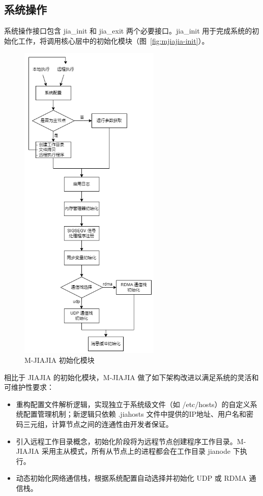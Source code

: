 {    \subsection{系统操作}\label{sec:init}
    系统操作接口包含 jia\_init 和 jia\_exit 两个必要接口。jia\_init 用于完成系统的初始化工作，将调用核心层中的初始化模块（图~\ref{fig:mjiajia-init}）。
    \begin{figure}[!htbp]
        \centering
        \includegraphics[width=0.6\textwidth]{Img/M-JIAJIA-init.png}
        \caption{M-JIAJIA 初始化模块}
    \end{figure}
    相比于 JIAJIA 的初始化模块，M-JIAJIA 做了如下架构改进以满足系统的灵活和可维护性要求：
    \begin{itemize}
        \item 重构配置文件解析逻辑，实现独立于系统级文件（如 /etc/hosts）的自定义系统配置管理机制；新逻辑只依赖 .jiahosts 文件中提供的IP地址、用户名和密码三元组，计算节点之间的连通性由开发者保证。
        \item 引入远程工作目录概念，初始化阶段将为远程节点创建程序工作目录。M-JIAJIA 采用主从模式，所有从节点上的进程都会在工作目录 jianode 下执行。
        \item 动态初始化网络通信栈，根据系统配置自动选择并初始化 UDP 或 RDMA 通信栈。
    \end{itemize}

}
